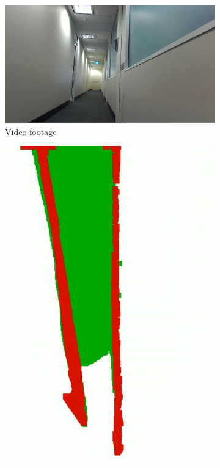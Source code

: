 \begin{figure}[b]
    \centering
    \begin{subfigure}{.6\textwidth}
        \centering
        \includegraphics[width=\linewidth]{images/vfh_fov_video.PNG}
        \caption{Video footage}
    \end{subfigure}
    \quad
    \begin{subfigure}{.3\textwidth}
        \centering
        \includegraphics[width=\linewidth]{images/vfh_fov_map.PNG}

\end{subfigure}
\end{figure}

